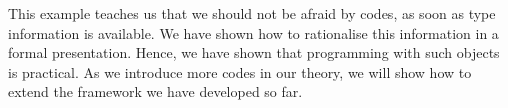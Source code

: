 This example teaches us that we should not be afraid by codes, as soon
as type information is available. We have shown how to rationalise
this information in a formal presentation. Hence, we have shown that
programming with such objects is practical. As we introduce more codes
in our theory, we will show how to extend the framework we have
developed so far.
